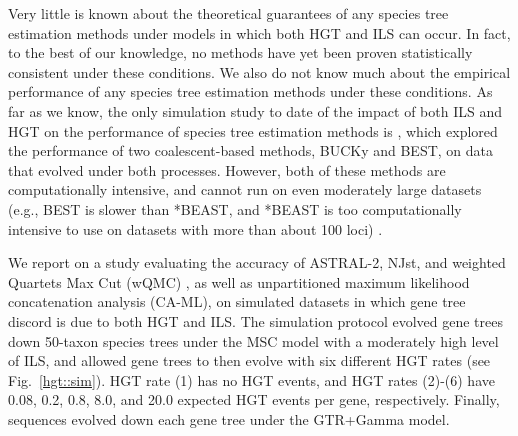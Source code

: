 
Very little is known about the
theoretical guarantees of any
species tree estimation methods under
models in which both HGT and ILS can occur.
In fact, to the best of our knowledge,
no methods have yet been proven statistically
consistent under these conditions.
We also do not know much about the empirical performance of
any species tree estimation methods under
these conditions.
As far as we know, the only simulation study to 
date of the impact of both ILS and HGT on 
the performance of species tree estimation methods is \cite{ChungAne},
which   explored  the performance of two coalescent-based methods, 
BUCKy  and BEST, on data that evolved 
under both processes. 
However, both
of these methods are computationally 
intensive, and cannot run on even moderately
large datasets
(e.g., BEST is slower than *BEAST, and *BEAST is
too computationally intensive to use on datasets with
more than about 100 loci)
\cite{YangWarnow,Zimmermann2014}.








We report
on a study evaluating
the accuracy  of 
ASTRAL-2, NJst, and 
weighted Quartets Max Cut (wQMC) \cite{wQMC}, as
well as  unpartitioned maximum likelihood concatenation analysis (CA-ML), 
on simulated datasets in which
gene tree discord is due to both HGT and ILS.
The simulation protocol evolved
gene trees down 50-taxon species trees under the MSC model with a moderately
high level of ILS, and allowed gene trees to then evolve with 
six different HGT rates (see Fig.~\ref{hgt::sim}). 
HGT rate (1) has no  HGT  events,
and 
HGT rates (2)-(6) have 0.08, 0.2, 0.8, 8.0, and
20.0  expected HGT events per gene, respectively.
Finally, sequences evolved down each gene tree under the GTR+Gamma model.

